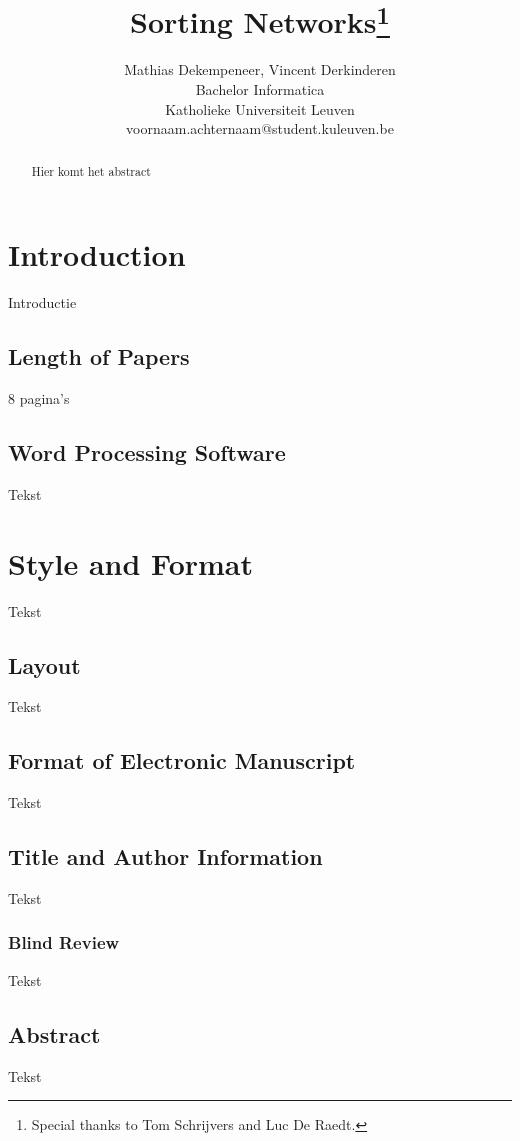\documentclass{article}
\title{Sorting Networks\thanks{Special thanks to Tom Schrijvers and Luc De Raedt.}}
\author{Mathias Dekempeneer, Vincent Derkinderen \\
Bachelor Informatica\\
Katholieke Universiteit Leuven \\
{voornaam.achternaam}@student.kuleuven.be}
\begin{document}
\maketitle

\begin{abstract}
Hier komt het abstract
\end{abstract}

\section{Introduction}
Introductie

\subsection{Length of Papers}

8 pagina's


\subsection{Word Processing Software}

Tekst

\section{Style and Format}

Tekst

\subsection{Layout}

Tekst

\subsection{Format of Electronic Manuscript}

Tekst

\subsection{Title and Author Information}

Tekst

\subsubsection{Blind Review}

Tekst

\subsection{Abstract}
Tekst
\end{document}
